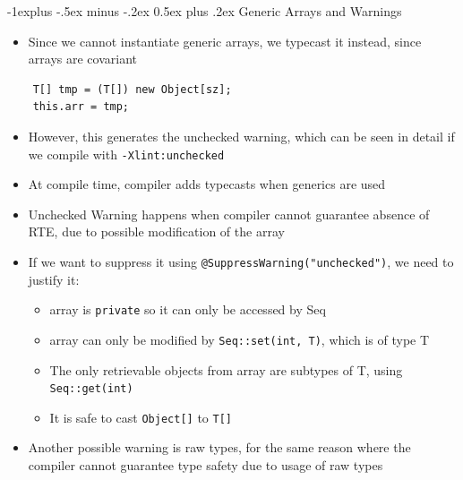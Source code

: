 \documentclass[10pt, landscape]{article}
\makeatletter
\renewcommand{\section}{\@startsection{section}{1}{0mm}%
                                {-1ex plus -.5ex minus -.2ex}%
                                {0.5ex plus .2ex}%
                                {\normalfont\large\bfseries}}
\renewcommand{\section}{\@startsection{section}{2}{0mm}%
                                {-1explus -.5ex minus -.2ex}%
                                {0.5ex plus .2ex}%
                                {\normalfont\normalsize\bfseries}}
\makeatother
\begin{document}
\begin{multicols*}{4}
\section{Generic Arrays and Warnings}
\begin{itemize}
    \item Since we cannot instantiate generic arrays, we typecast it instead, since arrays are covariant
\end{itemize}
\begin{lstlisting}
    T[] tmp = (T[]) new Object[sz];
    this.arr = tmp;
\end{lstlisting}
\begin{itemize}
    \item However, this generates the unchecked warning, which can be seen in detail if we compile with \lstinline{-Xlint:unchecked}
    \item At compile time, compiler adds typecasts when generics are used
    \item Unchecked Warning happens when compiler cannot guarantee absence of RTE, due to possible modification of the array
    \item If we want to suppress it using \lstinline{@SuppressWarning("unchecked")}, we need to justify it:
    \begin{itemize}
        \item array is \lstinline{private} so it can only be accessed by Seq
        \item array can only be modified by \lstinline{Seq::set(int, T)}, which is of type T
        \item The only retrievable objects from array are subtypes of T, using \lstinline{Seq::get(int)}
        \item It is safe to cast \lstinline{Object[]} to \lstinline{T[]}
    \end{itemize}
    \item Another possible warning is raw types, for the same reason where the compiler cannot guarantee type safety due to usage of raw types
\end{itemize}


\end{multicols*}
\end{document}
